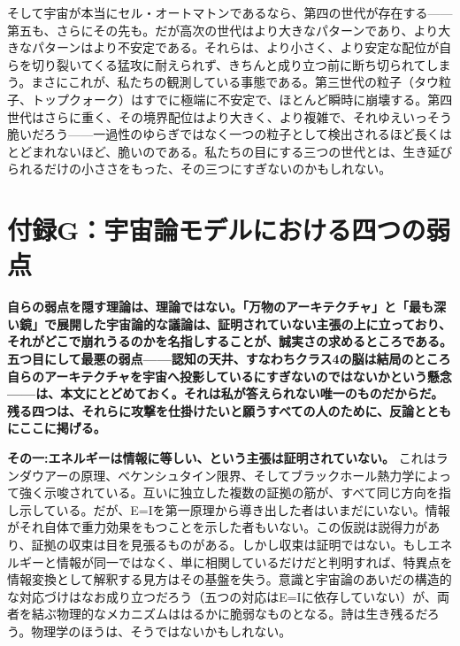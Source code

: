 \documentclass[11pt, twoside, openright]{book}
\begin{document}
そして宇宙が本当にセル・オートマトンであるなら、第四の世代が存在する------第五も、さらにその先も。だが高次の世代はより大きなパターンであり、より大きなパターンはより不安定である。それらは、より小さく、より安定な配位が自らを切り裂いてくる猛攻に耐えられず、きちんと成り立つ前に断ち切られてしまう。まさにこれが、私たちの観測している事態である。第三世代の粒子（タウ粒子、トップクォーク）はすでに極端に不安定で、ほとんど瞬時に崩壊する。第四世代はさらに重く、その境界配位はより大きく、より複雑で、それゆえいっそう脆いだろう------一過性のゆらぎではなく一つの粒子として検出されるほど長くはとどまれないほど、脆いのである。私たちの目にする三つの世代とは、生き延びられるだけの小ささをもった、その三つにすぎないのかもしれない。


\chapter*{付録G：宇宙論モデルにおける四つの弱点}

\textbf{自らの弱点を隠す理論は、理論ではない。「万物のアーキテクチャ」と「最も深い鏡」で展開した宇宙論的な議論は、証明されていない主張の上に立っており、それがどこで崩れうるのかを名指しすることが、誠実さの求めるところである。五つ目にして最悪の弱点------認知の天井、すなわちクラス4の脳は結局のところ自らのアーキテクチャを宇宙へ投影しているにすぎないのではないかという懸念------は、本文にとどめておく。それは私が答えられない唯一のものだからだ。残る四つは、それらに攻撃を仕掛けたいと願うすべての人のために、反論とともにここに掲げる。}

\textbf{その一:エネルギーは情報に等しい、という主張は証明されていない。} これはランダウアーの原理、ベケンシュタイン限界、そしてブラックホール熱力学によって強く示唆されている。互いに独立した複数の証拠の筋が、すべて同じ方向を指し示している。だが、E=Iを第一原理から導き出した者はいまだにいない。情報がそれ自体で重力効果をもつことを示した者もいない。この仮説は説得力があり、証拠の収束は目を見張るものがある。しかし収束は証明ではない。もしエネルギーと情報が同一ではなく、単に相関しているだけだと判明すれば、特異点を情報変換として解釈する見方はその基盤を失う。意識と宇宙論のあいだの構造的な対応づけはなお成り立つだろう（五つの対応はE=Iに依存していない）が、両者を結ぶ物理的なメカニズムははるかに脆弱なものとなる。詩は生き残るだろう。物理学のほうは、そうではないかもしれない。
\end{document}
